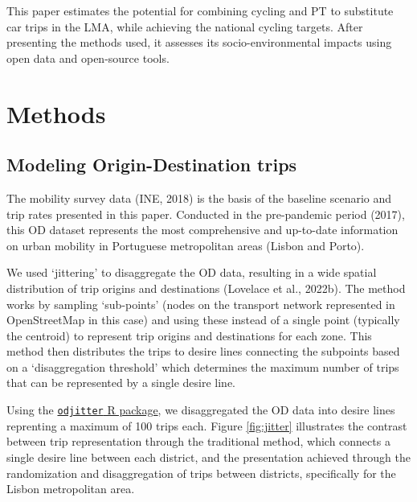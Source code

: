 \documentclass[review, doubleblind, 3p,
authoryear]{elsarticle} %
\begin{document}
This paper estimates the potential for combining cycling and PT to
substitute car trips in the LMA, while achieving the national cycling
targets. After presenting the methods used, it assesses its
socio-environmental impacts using open data and open-source tools.

\hypertarget{methods}{%
\section{Methods}\label{methods}}

\hypertarget{modeling-origin-destination-trips}{%
\subsection{Modeling Origin-Destination
trips}\label{modeling-origin-destination-trips}}

The mobility survey data (INE, 2018) is the basis of the baseline
scenario and trip rates presented in this paper. Conducted in the
pre-pandemic period (2017), this OD dataset represents the most
comprehensive and up-to-date information on urban mobility in Portuguese
metropolitan areas (Lisbon and Porto).

We used `jittering' to disaggregate the OD data, resulting in a wide
spatial distribution of trip origins and destinations (Lovelace et al.,
2022b). The method works by sampling `sub-points' (nodes on the
transport network represented in OpenStreetMap in this case) and using
these instead of a single point (typically the centroid) to represent
trip origins and destinations for each zone. This method then
distributes the trips to desire lines connecting the subpoints based on
a `disaggregation threshold' which determines the maximum number of
trips that can be represented by a single desire line.

Using the
\href{https://github.com/dabreegster/odjitter}{\texttt{odjitter} R
package}, we disaggregated the OD data into desire lines reprenting a
maximum of 100 trips each. Figure \ref{fig:jitter} illustrates the
contrast between trip representation through the traditional method,
which connects a single desire line between each district, and the
presentation achieved through the randomization and disaggregation of
trips between districts, specifically for the Lisbon metropolitan area.
\end{document}
